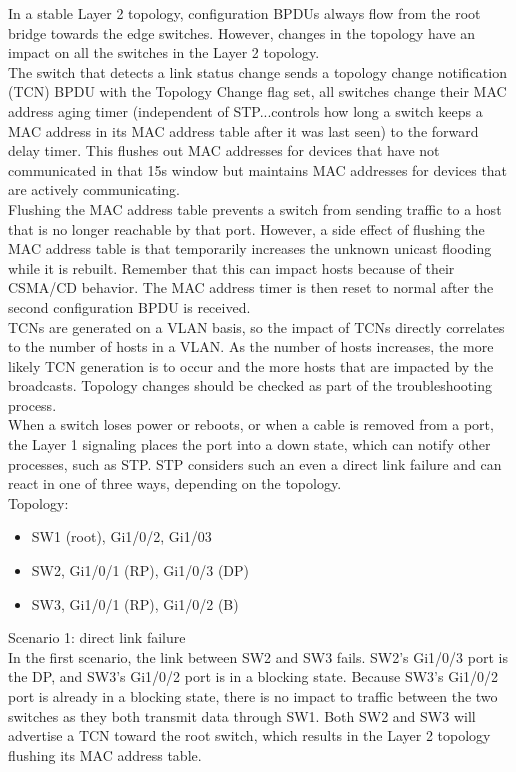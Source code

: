 \documentclass[parindent=0pt]{article}
\begin{document}
	In a stable Layer 2 topology, configuration BPDUs always flow from the root bridge towards the edge switches. However, changes in the topology have an impact on all the switches in the Layer 2 topology.\\

	The switch that detects a link status change sends a topology change notification (TCN) BPDU with the Topology Change flag set, all switches change their MAC address aging timer (independent of STP...controls how long a switch keeps a MAC address in its MAC address table after it was last seen) to the forward delay timer. This flushes out MAC addresses for devices that have not communicated in that 15s window but maintains MAC addresses for devices that are actively communicating.\\	

	Flushing the MAC address table prevents a switch from sending traffic to a host that is no longer reachable by that port. However, a side effect of flushing the MAC address table is that temporarily increases the unknown unicast flooding while it is rebuilt. Remember that this can impact hosts because of their CSMA/CD behavior. The MAC address timer is then reset to normal after the second configuration BPDU is received.\\

	TCNs are generated on a VLAN basis, so the impact of TCNs directly correlates to the number of hosts in a VLAN. As the number of hosts increases, the more likely TCN generation is to occur and the more hosts that are impacted by the broadcasts. Topology changes should be checked as part of the troubleshooting process.\\

	When a switch loses power or reboots, or when a cable is removed from a port, the Layer 1 signaling places the port into a down state, which can notify other processes, such as STP. STP considers such an even a direct link failure and can react in one of three ways, depending on the topology.\\

	Topology:
		\begin{itemize}
			\item SW1 (root), Gi1/0/2, Gi1/03
			\item SW2, Gi1/0/1 (RP), Gi1/0/3 (DP)
			\item SW3, Gi1/0/1 (RP), Gi1/0/2 (B)
		\end{itemize}

	Scenario 1: direct link failure\\
		In the first scenario, the link between SW2 and SW3 fails. SW2's Gi1/0/3 port is the DP, and SW3's Gi1/0/2 port is in a blocking state. Because SW3's Gi1/0/2 port is already in a blocking state, there is no impact to traffic between the two switches as they both transmit data through SW1. Both SW2 and SW3 will advertise a TCN toward the root switch, which results in the Layer 2 topology flushing its MAC address table.	
\end{document}
